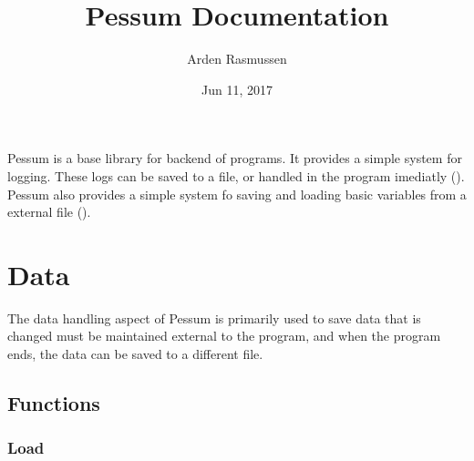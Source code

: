\documentclass[letterpaper,10pt,english]{sphinxmanual}
\title{Pessum Documentation}
\date{Jun 11, 2017}
\author{Arden Rasmussen}
\begin{document}
\maketitle
\sphinxtableofcontents
{}\label{\detokenize{index::doc}}


Pessum is a base library for backend of programs. It provides a simple system
for logging. These logs can be saved to a file, or handled in the program
imediatly ({\hyperref[\detokenize{log::doc}]{}}). Pessum also provides a simple system fo saving and
loading basic variables from a external file ({\hyperref[\detokenize{data::doc}]{}}).


\chapter{Data}
\label{\detokenize{data::doc}}\label{\detokenize{data:pessum-documentation}}\label{\detokenize{data:data}}
The data handling aspect of Pessum is primarily used to save data that is
changed must be maintained external to the program, and when the program ends,
the data can be saved to a different file.


\section{Functions}
\label{\detokenize{data:functions}}

\subsection{Load}
\label{\detokenize{data:load}}
\end{document}
